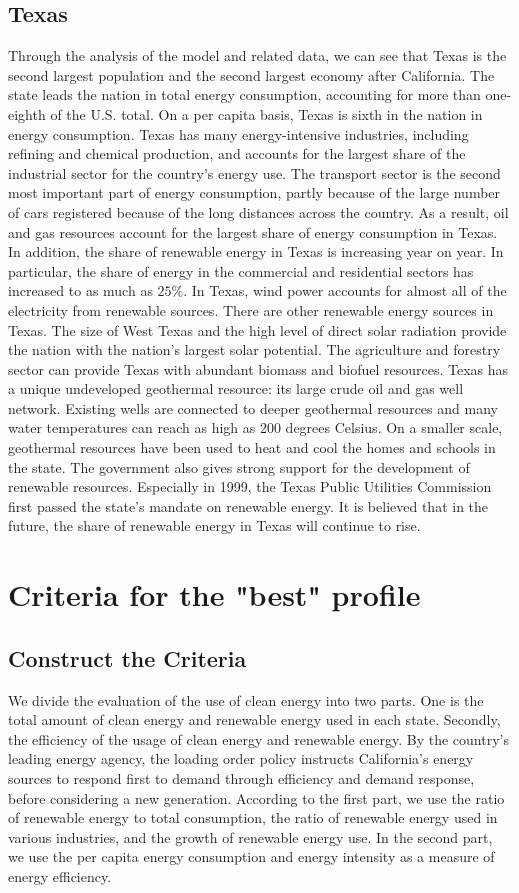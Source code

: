 \documentclass{mcmthesis}
\begin{document}
\subsection{Texas}
Through the analysis of the model and related data, we can see that Texas is the second largest population and the second largest economy after California.
The state leads the nation in total energy consumption, accounting for more than one-eighth of the U.S. total.
On a per capita basis, Texas is sixth in the nation in energy consumption.
Texas has many energy-intensive industries, including refining and chemical production, and accounts for the largest share of the industrial sector for the country's energy use.
The transport sector is the second most important part of energy consumption, partly because of the large number of cars registered because of the long distances across the country.
As a result, oil and gas resources account for the largest share of energy consumption in Texas. In addition, the share of renewable energy in Texas is increasing year on year.
In particular, the share of energy in the commercial and residential sectors has increased to as much as $25\%$.
In Texas, wind power accounts for almost all of the electricity from renewable sources. There are other renewable energy sources in Texas.
The size of West Texas and the high level of direct solar radiation provide the nation with the nation's largest solar potential.
The agriculture and forestry sector can provide Texas with abundant biomass and biofuel resources.
Texas has a unique undeveloped geothermal resource: its large crude oil and gas well network.
Existing wells are connected to deeper geothermal resources and many water temperatures can reach as high as 200 degrees Celsius.
On a smaller scale, geothermal resources have been used to heat and cool the homes and schools in the state.
The government also gives strong support for the development of renewable resources.
Especially in 1999, the Texas Public Utilities Commission first passed the state's mandate on renewable energy.
It is believed that in the future, the share of renewable energy in Texas will continue to rise.

\section{Criteria for the "best" profile}
\subsection{Construct the Criteria}
We divide the evaluation of the use of clean energy into two parts.
One is the total amount of clean energy and renewable energy used in each state.
Secondly, the efficiency of the usage of clean energy and renewable energy.
By the country's leading energy agency, the loading order policy instructs California's energy sources to respond first to demand through efficiency and demand response,
before considering a new generation. %
According to the first part, we use the ratio of renewable energy to total consumption, the ratio of renewable energy used in various industries,
and the growth of renewable energy use. In the second part, we use the per capita energy consumption and energy intensity as a measure of energy efficiency.
\end{document}
